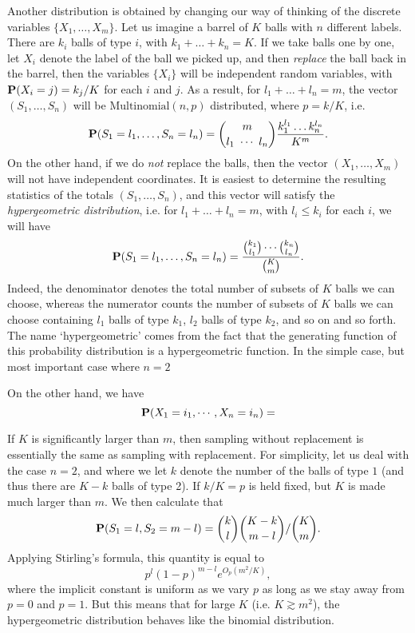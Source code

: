 Another distribution is obtained by changing our way of thinking of the discrete variables $\{ X_1,\dots, X_m \}$. Let us imagine a barrel of $K$ balls with $n$ different labels. There are $k_i$ balls of type $i$, with $k_1 + \dots + k_n = K$. If we take balls one by one, let $X_i$ denote the label of the ball we picked up, and then \emph{replace} the ball back in the barrel, then the variables $\{ X_i \}$ will be independent random variables, with $\operatorname{\mathbf{P}}(X_i = j) = k_j / K$ for each $i$ and $j$. As a result, for $l_1 + \dots + l_n = m$, the vector $(S_1,\dots,S_n)$ will be $\text{Multinomial}(n,p)$ distributed, where $p = k / K$, i.e. 
%
\[ \operatorname{\mathbf{P}}(S_1 = l_1, \dots, S_n = l_n) = {m \choose l_1\ \cdots\ l_n} \frac{k_1^{l_1} \dots k_n^{l_n}}{K^m}. \]
%
On the other hand, if we do \emph{not} replace the balls, then the vector $(X_1,\dots,X_m)$ will not have independent coordinates. It is easiest to determine the resulting statistics of the totals $(S_1,\dots,S_n)$, and this vector will satisfy the \emph{hypergeometric distribution}, i.e. for $l_1 + \dots + l_n = m$, with $l_i \leq k_i$ for each $i$, we will have
%
\[ \operatorname{\mathbf{P}}(S_1 = l_1, \dots, S_n = l_n) = \frac{ {k_1 \choose l_1} \cdots {k_n \choose l_n} }{ { K \choose m } }. \]
%
Indeed, the denominator denotes the total number of subsets of $K$ balls we can choose, whereas the numerator counts the number of subsets of $K$ balls we can choose containing $l_1$ balls of type $k_1$, $l_2$ balls of type $k_2$, and so on and so forth. The name `hypergeometric' comes from the fact that the generating function of this probability distribution is a hypergeometric function. In the simple case, but most important case where $n = 2$

On the other hand, we have
%
\[ \operatorname{\mathbf{P}}(X_1 = i_1, \cdots, X_n = i_n) =  \]

If $K$ is significantly larger than $m$, then sampling without replacement is essentially the same as sampling with replacement. For simplicity, let us deal with the case $n = 2$, and where we let $k$ denote the number of the balls of type $1$ (and thus there are $K - k$ balls of type 2). If $k/K = p$ is held fixed, but $K$ is made much larger than $m$. We then calculate that
%
\[ \operatorname{\mathbf{P}}(S_1 = l, S_2 = m - l) = {k \choose l} {K-k \choose m-l} / {K \choose m}. \]
%
Applying Stirling's formula, this quantity is equal to
%
\[ p^l (1 - p)^{m-l} e^{O_p(m^2/K)}, \]
%
where the implicit constant is uniform as we vary $p$ as long as we stay away from $p = 0$ and $p = 1$. But this means that for large $K$ (i.e. $K \gtrsim m^2$), the hypergeometric distribution behaves like the binomial distribution.

